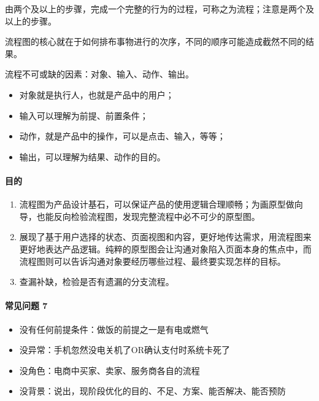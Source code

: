 \documentclass[letterpaper,10pt,english]{sphinxmanual}
\begin{document}
由两个及以上的步骤，完成一个完整的行为的过程，可称之为流程；注意是两个及以上的步骤。

流程图的核心就在于如何排布事物进行的次序，不同的顺序可能造成截然不同的结果。

流程不可或缺的因素：对象、输入、动作、输出。
\begin{itemize}
\item {} 
对象就是执行人，也就是产品中的用户；

\item {} 
输入可以理解为前提、前置条件；

\item {} 
动作，就是产品中的操作，可以是点击、输入，等等；

\item {} 
输出，可以理解为结果、动作的目的。

\end{itemize}


\paragraph{目的}
\label{\detokenize{chapter_knowledge/flow_chart:id5}}\begin{enumerate}
%
\item {} 
流程图为产品设计基石，可以保证产品的使用逻辑合理顺畅；为画原型做向导，也能反向检验流程图，发现完整流程中必不可少的原型图。

\item {} 
展现了基于用户选择的状态、页面视图和内容，更好地传达需求，用流程图来更好地表达产品逻辑。纯粹的原型图会让沟通对象陷入页面本身的焦点中，而流程图则可以告诉沟通对象要经历哪些过程、最终要实现怎样的目标。

\item {} 
查漏补缺，检验是否有遗漏的分支流程。

\end{enumerate}


\paragraph{常见问题 7\sphinxfootnotemark[582]}
\label{\detokenize{chapter_knowledge/flow_chart:id6}}%
\begin{footnotetext}[582]\sphinxAtStartFootnote
{}
%
\end{footnotetext}\ignorespaces \begin{itemize}
\item {} 
没有任何前提条件：做饭的前提之一是有电或燃气

\item {} 
没异常：手机忽然没电关机了OR确认支付时系统卡死了

\item {} 
没角色：电商中买家、卖家、服务商各自的流程

\item {} 
没背景：说出，现阶段优化的目的、不足、方案、能否解决、能否预防

\end{itemize}
\end{document}
